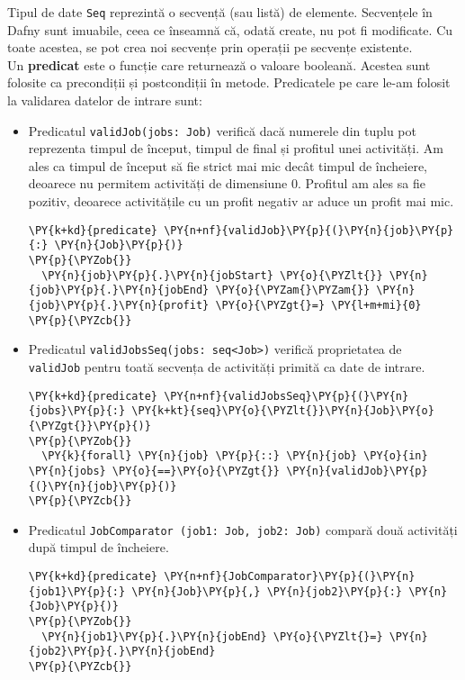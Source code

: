 Tipul de date \texttt{Seq} reprezintă o secvență (sau listă) de elemente. Secvențele în Dafny sunt imuabile, ceea ce înseamnă că, odată create, nu pot fi modificate. Cu toate acestea, se pot crea noi secvențe prin operații pe secvențe existente.\\

Un \textbf{predicat} este o funcție care returnează o valoare booleană\citep{DBLP:series/natosec/KoenigL12}. Acestea sunt folosite ca precondiții și postcondiții în metode. Predicatele pe care le-am folosit la validarea datelor de intrare sunt:
\begin{itemize}
    \item Predicatul \texttt{validJob(jobs: Job)} verifică dacă numerele din tuplu pot reprezenta timpul de început, timpul de final și profitul unei activități. 
Am ales ca timpul de început să fie strict mai mic decât timpul de încheiere, deoarece nu permitem activități de dimensiune 0. 
Profitul am ales sa fie pozitiv, deoarece activitățile cu un profit negativ ar aduce un profit mai mic.
\begin{Verbatim}[commandchars=\\\{\}, fontsize=\footnotesize]
\PY{k+kd}{predicate} \PY{n+nf}{validJob}\PY{p}{(}\PY{n}{job}\PY{p}{:} \PY{n}{Job}\PY{p}{)}
\PY{p}{\PYZob{}}
  \PY{n}{job}\PY{p}{.}\PY{n}{jobStart} \PY{o}{\PYZlt{}} \PY{n}{job}\PY{p}{.}\PY{n}{jobEnd} \PY{o}{\PYZam{}\PYZam{}} \PY{n}{job}\PY{p}{.}\PY{n}{profit} \PY{o}{\PYZgt{}=} \PY{l+m+mi}{0}
\PY{p}{\PYZcb{}} 
\end{Verbatim} 
    \item Predicatul \texttt{validJobsSeq(jobs: seq<Job>)} verifică proprietatea de \\\texttt{validJob} pentru toată secvența de activități primită ca date de intrare. \begin{Verbatim}[commandchars=\\\{\},fontsize=\footnotesize]
\PY{k+kd}{predicate} \PY{n+nf}{validJobsSeq}\PY{p}{(}\PY{n}{jobs}\PY{p}{:} \PY{k+kt}{seq}\PY{o}{\PYZlt{}}\PY{n}{Job}\PY{o}{\PYZgt{}}\PY{p}{)}
\PY{p}{\PYZob{}}
  \PY{k}{forall} \PY{n}{job} \PY{p}{::} \PY{n}{job} \PY{o}{in} \PY{n}{jobs} \PY{o}{==}\PY{o}{\PYZgt{}} \PY{n}{validJob}\PY{p}{(}\PY{n}{job}\PY{p}{)}
\PY{p}{\PYZcb{}}
\end{Verbatim} 
    \item Predicatul \texttt{JobComparator (job1: Job, job2: Job)} compară două activități după timpul de încheiere.\begin{Verbatim}[commandchars=\\\{\}, fontsize=\footnotesize]
\PY{k+kd}{predicate} \PY{n+nf}{JobComparator}\PY{p}{(}\PY{n}{job1}\PY{p}{:} \PY{n}{Job}\PY{p}{,} \PY{n}{job2}\PY{p}{:} \PY{n}{Job}\PY{p}{)}
\PY{p}{\PYZob{}}
  \PY{n}{job1}\PY{p}{.}\PY{n}{jobEnd} \PY{o}{\PYZlt{}=} \PY{n}{job2}\PY{p}{.}\PY{n}{jobEnd}
\PY{p}{\PYZcb{}}
\end{Verbatim}


\end{itemize}
